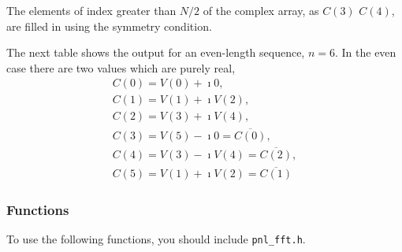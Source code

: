 The elements of index greater than $N/2$ of the complex array, as $C(3)$
$C(4)$, are filled in using the symmetry condition.

The next table shows the output for an even-length sequence, $n=6$.
In the even case there are two values which are purely real,
\begin{equation}
  \begin{array}{l}
    C(0) =  V(0) + \imath 0, \\
    C(1) =  V(1) + \imath V(2), \\
    C(2) =  V(3) + \imath V(4), \\
    C(3) = V(5) - \imath 0    =  \overline{C(0)} , \\
    C(4) = V(3) - \imath V(4) =  \overline{C(2)} , \\
    C(5) = V(1) + \imath V(2) =  \overline{C(1)}
  \end{array}
\end{equation}


\subsubsection{Functions}

To use the following functions, you should include \verb!pnl_fft.h!.

